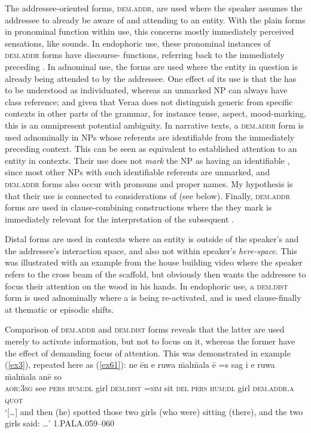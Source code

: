 \documentclass[output=paper
,modfonts
,nonflat]{langsci/langscibook}
\begin{document}
The addressee-oriented forms, \textsc{dem.addr}, are used where the speaker assumes the addressee to already be aware of and attending to an entity. With the plain forms in pronominal function within  use, this concerns mostly immediately perceived sensations, like sounds. In endophoric use, these pronominal instances of \textsc{dem.addr} forms have discourse- functions, referring back to the immediately preceding . In adnominal use, the forms are used where the entity in question is already being attended to by the addressee. One effect of its use is that the  has to be understood as individuated, whereas an unmarked NP can always have class reference; and given that Vera{\textquotesingle}a does not distinguish generic from specific contexts in other parts of the grammar, for instance tense, aspect, mood-marking, this is an omnipresent potential ambiguity. In narrative texts, a \textsc{dem.addr} form is used adnominally in NPs whose referents are identifiable from the immediately preceding  context. This can be seen as equivalent to established attention to an entity in  contexts. Their use does not \emph{mark} the NP as having an identifiable , since most other NPs with such identifiable referents are unmarked, and \textsc{dem.addr} forms also occur with pronouns and proper names. My hypothesis is that their use is connected to considerations of  (see below). Finally, \textsc{dem.addr} forms are used in clause-combining constructions where the  they mark is immediately relevant for the interpretation of the subsequent .\largerpage[-1]

Distal forms are used in  contexts where an entity is outside of the speaker's and the addressee's interaction space, and also not within speaker's \textit{here-space}. This was illustrated with an example from the house building video where the speaker refers to the cross beam of the scaffold, but obviously then wants the addressee to focus their attention on the wood in his hands. In endophoric use, a \textsc{dem.dist} form is used adnominally where a  is being re-activated, and is used clause-finally at thematic or episodic shifts.

Comparison of \textsc{dem.addr} and \textsc{dem.dist} forms reveals that the latter are used merely to activate information, but not to focus on it, whereas the former have the effect of demanding focus of attention. This was demonstrated in example (\ref{ex3}), repeated here as (\ref{ex61}):
\ea	\label{ex61}
\gll		ne				{\textquotesingle}\=en	e		ruwa	\=mal\=mala	\=e		=s 		sag	{\textquotesingle}i		e		ruwa 	\=mal\=mala	an\=e		so		\\
\textsc{aor:3sg}		see		\textsc{pers}	\textsc{hum:dl}		girl		\textsc{dem.dist}	\textsc{=sim}		sit		\textsc{del}	\textsc{pers}	\textsc{hum:dl}		girl			\textsc{dem.addr.a}	\textsc{quot}			\\
\glt	`[\dots] and then (he) spotted those two girls (who were) sitting (there), and the two girls said: \dots'	\hfill{1.PALA.059--060}
\z
\end{document}
